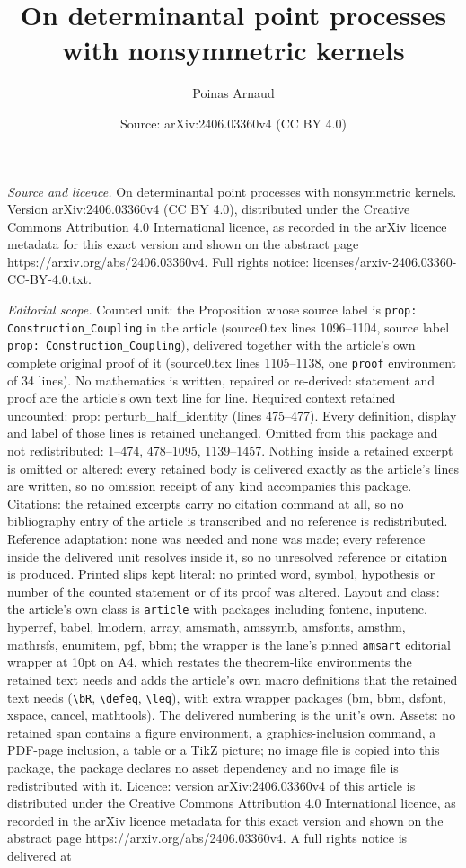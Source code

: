 \documentclass[10pt,a4paper]{amsart}
\title[On determinantal point processes with nonsymmetric kernels]{On determinantal point processes with nonsymmetric kernels}
\author{Poinas Arnaud}
\date{Source: arXiv:2406.03360v4 (CC BY 4.0)}
\begin{document}
\maketitle

\noindent\emph{Source and licence.} On determinantal point processes with nonsymmetric kernels. Version arXiv:2406.03360v4 (CC BY 4.0), distributed under the Creative Commons Attribution 4.0 International licence, as recorded in the arXiv licence metadata for this exact version and shown on the abstract page https://arxiv.org/abs/2406.03360v4. Full rights notice: licenses/arxiv-2406.03360-CC-BY-4.0.txt.\par\smallskip

\noindent\textit{Editorial scope.} Counted unit: the Proposition whose source label is \texttt{prop: Construction\_Coupling} in the article (source0.tex lines 1096--1104, source label \texttt{prop: Construction\_Coupling}), delivered together with the article's own complete original proof of it (source0.tex lines 1105--1138, one \texttt{proof} environment of 34 lines). No mathematics is written, repaired or re-derived: statement and proof are the article's own text line for line. Required context retained uncounted: prop: perturb\_half\_identity (lines 475--477). Every definition, display and label of those lines is retained unchanged. Omitted from this package and not redistributed: 1--474, 478--1095, 1139--1457. Nothing inside a retained excerpt is omitted or altered: every retained body is delivered exactly as the article's lines are written, so no omission receipt of any kind accompanies this package. Citations: the retained excerpts carry no citation command at all, so no bibliography entry of the article is transcribed and no reference is redistributed. Reference adaptation: none was needed and none was made; every reference inside the delivered unit resolves inside it, so no unresolved reference or citation is produced. Printed slips kept literal: no printed word, symbol, hypothesis or number of the counted statement or of its proof was altered. Layout and class: the article's own class is \texttt{article} with packages including fontenc, inputenc, hyperref, babel, lmodern, array, amsmath, amssymb, amsfonts, amsthm, mathrsfs, enumitem, pgf, bbm; the wrapper is the lane's pinned \texttt{amsart} editorial wrapper at 10pt on A4, which restates the theorem-like environments the retained text needs and adds the article's own macro definitions that the retained text needs (\texttt{\textbackslash bR}, \texttt{\textbackslash defeq}, \texttt{\textbackslash leq}), with extra wrapper packages (bm, bbm, dsfont, xspace, cancel, mathtools). The delivered numbering is the unit's own. Assets: no retained span contains a figure environment, a graphics-inclusion command, a PDF-page inclusion, a table or a TikZ picture; no image file is copied into this package, the package declares no asset dependency and no image file is redistributed with it. Licence: version arXiv:2406.03360v4 of this article is distributed under the Creative Commons Attribution 4.0 International licence, as recorded in the arXiv licence metadata for this exact version and shown on the abstract page https://arxiv.org/abs/2406.03360v4. A full rights notice is delivered at 
\end{document}
